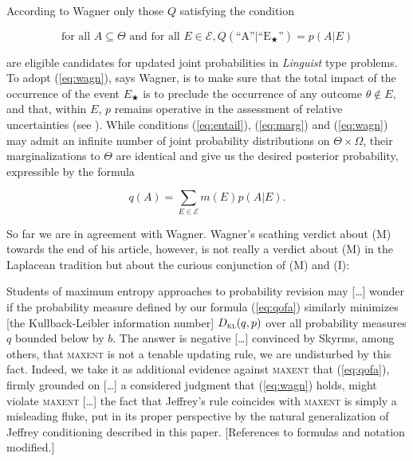 According to Wagner only those $Q$ satisfying the condition

\begin{equation}
  \label{eq:wagn}
  \mbox{for all }A\subseteq\Theta\mbox{ and for all }E\in\mathcal{E},Q(\mbox{``A''}|\mbox{``E$_{\bigstar}$''})=p(A|E)
\end{equation}

are eligible candidates for updated joint probabilities in
\emph{Linguist} type problems. 
To adopt (\ref{eq:wagn}), says Wagner, is to make sure
that the total impact of the occurrence of the event $E_{\bigstar}$ is
to preclude the occurrence of any outcome $\theta\notin{}E$, and that,
within $E$, $p$ remains operative in the assessment of relative
uncertainties (see ). While conditions
(\ref{eq:entail}), (\ref{eq:marg}) and (\ref{eq:wagn}) may admit an
infinite number of joint probability distributions on
$\Theta\times\Omega$, their marginalizations to $\Theta$ are identical
and give us the desired posterior probability, expressible by the
formula

\begin{equation}
  \label{eq:qofa}
  q(A)=\sum_{E\in\mathcal{E}}m(E)p(A|E).
\end{equation}

So far we are in agreement with Wagner. Wagner's scathing verdict
about (M) towards the end of his article, however, is not really a
verdict about (M) in the Laplacean tradition but about the curious
conjunction of (M) and (I):

\begin{quotex}
  Students of maximum entropy approaches to probability revision may
  [\ldots] wonder if the probability measure defined by our formula
  (\ref{eq:qofa}) similarly minimizes [the Kullback-Leibler
  information number] $D_{\textsc{kl}}(q,p)$ over all probability
  measures $q$ bounded below by $b$. The answer is negative [\ldots]
  convinced by Skyrms, among others, that \textsc{maxent} is not a
  tenable updating rule, we are undisturbed by this fact. Indeed, we
  take it as additional evidence against \textsc{maxent} that
  (\ref{eq:qofa}), firmly grounded on [\ldots] a considered judgment
  that (\ref{eq:wagn}) holds, might violate \textsc{maxent} [\ldots]
  the fact that Jeffrey's rule coincides with \textsc{maxent} is
  simply a misleading fluke, put in its proper perspective by the
  natural generalization of Jeffrey conditioning described in
  this paper. [References to formulas and notation modified.]
\end{quotex}

